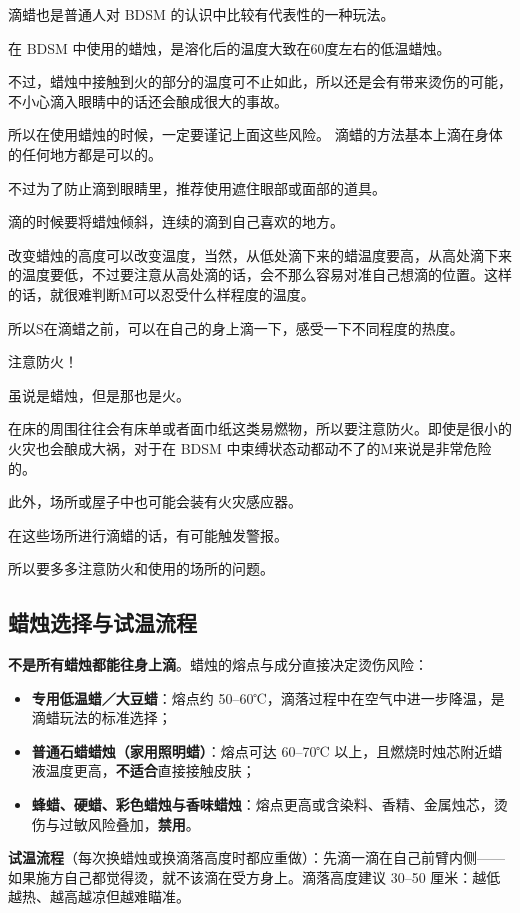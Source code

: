 \documentclass[12pt,UTF8]{ctexbook}
\begin{document}
滴蜡也是普通人对 BDSM 的认识中比较有代表性的一种玩法。

在 BDSM 中使用的蜡烛，是溶化后的温度大致在60度左右的低温蜡烛。

不过，蜡烛中接触到火的部分的温度可不止如此，所以还是会有带来烫伤的可能，不小心滴入眼睛中的话还会酿成很大的事故。

所以在使用蜡烛的时候，一定要谨记上面这些风险。 滴蜡的方法基本上滴在身体的任何地方都是可以的。

不过为了防止滴到眼睛里，推荐使用遮住眼部或面部的道具。

滴的时候要将蜡烛倾斜，连续的滴到自己喜欢的地方。

改变蜡烛的高度可以改变温度，当然，从低处滴下来的蜡温度要高，从高处滴下来的温度要低，不过要注意从高处滴的话，会不那么容易对准自己想滴的位置。这样的话，就很难判断M可以忍受什么样程度的温度。

所以S在滴蜡之前，可以在自己的身上滴一下，感受一下不同程度的热度。

注意防火！

虽说是蜡烛，但是那也是火。

在床的周围往往会有床单或者面巾纸这类易燃物，所以要注意防火。即使是很小的火灾也会酿成大祸，对于在 BDSM 中束缚状态动都动不了的M来说是非常危险的。

此外，场所或屋子中也可能会装有火灾感应器。

在这些场所进行滴蜡的话，有可能触发警报。

所以要多多注意防火和使用的场所的问题。

\subsection{蜡烛选择与试温流程}

\textbf{不是所有蜡烛都能往身上滴}。蜡烛的熔点与成分直接决定烫伤风险：

\begin{itemize}
\item \textbf{专用低温蜡／大豆蜡}：熔点约 50--60℃，滴落过程中在空气中进一步降温，是滴蜡玩法的标准选择；
\item \textbf{普通石蜡蜡烛（家用照明蜡）}：熔点可达 60--70℃ 以上，且燃烧时烛芯附近蜡液温度更高，\textbf{不适合}直接接触皮肤；
\item \textbf{蜂蜡、硬蜡、彩色蜡烛与香味蜡烛}：熔点更高或含染料、香精、金属烛芯，烫伤与过敏风险叠加，\textbf{禁用}。
\end{itemize}

\noindent\textbf{试温流程}（每次换蜡烛或换滴落高度时都应重做）：先滴一滴在自己前臂内侧——如果施方自己都觉得烫，就不该滴在受方身上。滴落高度建议 30--50 厘米：越低越热、越高越凉但越难瞄准。
\end{document}
